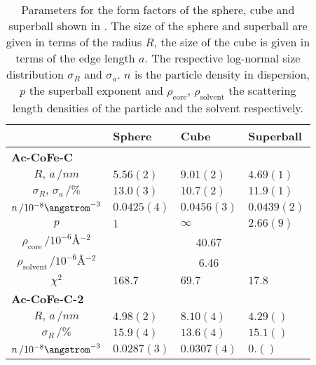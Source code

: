 \documentclass[\main/dresen_thesis.tex]{subfiles}
\begin{document}
    \begin{table}[ht]
      \centering
      \caption{\label{tab:monolayers:nanoparticle:saxs:shapeModelStudy}Parameters for the form factors of the sphere, cube and superball shown in . The size of the sphere and superball are given in terms of the radius $R$, the size of the cube is given in terms of the edge length $a$. The respective log-normal size distribution $\sigma_R$ and $\sigma_a$. $n$ is the particle density in dispersion, $p$ the superball exponent and $\rho_\mathrm{core}$, $\rho_\mathrm{solvent}$ the scattering length densities of the particle and the solvent respectively.}
      \begin{tabular}{ c | l | l | l }
          & \textbf{Sphere} & \textbf{Cube} & \textbf{Superball}\\
        \hline
          \multicolumn{4}{l}{\textbf{Ac-CoFe-C}}\\
        \hline
        \rule{0pt}{2ex} $R, \, a \, / \unit{nm}$                      & $5.56(2)$      & $9.01(2)$  & $4.69(1)$\\
        \rule{0pt}{2ex} $\sigma_R, \, \sigma_a \, / \unit{\%}$        & $13.0(3)$      & $10.7(2)$  & $11.9(1)$\\
        \rule{0pt}{2ex} $n \, / 10^{-8} \angstrom^{-3}$               & $0.0425(4)$    & $0.0456(3)$& $0.0439(2)$\\
        \rule{0pt}{2ex} $p$                                           & $1$            & $\infty$   & $2.66(9)$\\
        \hline
        \rule{0pt}{2ex} $\rho_\mathrm{core}    \, / \unit{10^{-6} \angstrom^{-2}}$     & \multicolumn{3}{c}{40.67}\\
        \rule{0pt}{2ex} $\rho_\mathrm{solvent} \, / \unit{10^{-6} \angstrom^{-2}}$     & \multicolumn{3}{c}{6.46}\\
        \hline
        \rule{0pt}{2ex} $\chi^2$                                      & $168.7$        & $69.7$     & $17.8$\\
        \hline
        \hline
        \multicolumn{4}{l}{\textbf{Ac-CoFe-C-2}}\\
        \hline
        \rule{0pt}{2ex} $R, \, a \, / \unit{nm}$                      & $4.98(2)$      & $8.10(4)$  & $4.29()$\\
        \rule{0pt}{2ex} $\sigma_R \, / \unit{\%}$                     & $15.9(4)$      & $13.6(4)$  & $15.1()$\\
        \rule{0pt}{2ex} $n \, / 10^{-8} \angstrom^{-3}$               & $0.0287(3)$    & $0.0307(4)$& $0.()$\\

\end{tabular}
\end{table}
\end{document}
